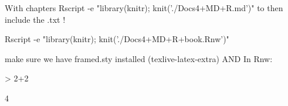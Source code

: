 \documentclass{article}
\begin{document}
With chapters
Rscript -e "library(knitr); knit('./Docs4+MD+R.md')"  to then include the .txt !

Rscript -e "library(knitr); knit('./Docs4+MD+R+book.Rnw')"

make sure we have framed.sty installed  (texlive-latex-extra)
AND In Rnw:

\begin{Schunk}
\begin{Sinput}
> 2+2
\end{Sinput}
\begin{Soutput}
[1] 4
\end{Soutput}
\end{Schunk}




\end{document}
